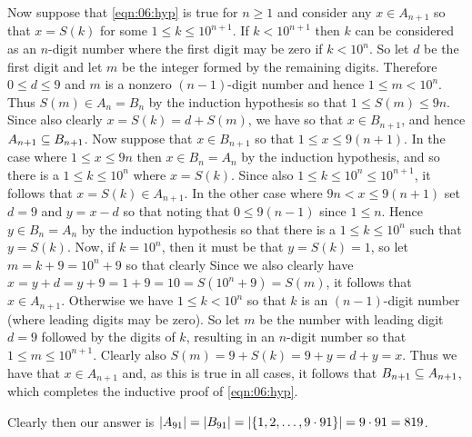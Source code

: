 \documentclass{article}
\begin{document}
{  Now suppose that \eqref{eqn:06:hyp} is true for $n \geq 1$ and consider any $x \in A_{n+1}$ so that $x = S(k)$ for some $1 \leq k \leq 10^{n+1}$.
  If $k < 10^{n+1}$ then $k$ can be considered as an $n$-digit number where the first digit may be zero if $k < 10^n$.
  So let $d$ be the first digit and let $m$ be the integer formed by the remaining digits.
  Therefore $0 \leq d \leq 9$ and $m$ is a nonzero $(n-1)$-digit number and hence $1 \leq m < 10^n$.
  Thus $S(m) \in A_n = B_n$ by the induction hypothesis so that $1 \leq S(m) \leq 9n$.
  Since also clearly $x = S(k) = d + S(m)$, we have
  so that $x \in B_{n+1}$, and hence $A_{n+1} \ss B_{n+1}$.
  Now suppose that $x \in B_{n+1}$ so that $1 \leq x \leq 9(n+1)$.
  In the case where $1 \leq x \leq 9n$ then $x \in B_n = A_n$ by the induction hypothesis, and so there is a $1 \leq k \leq 10^n$ where $x = S(k)$.
  Since also $1 \leq k \leq 10^n \leq 10^{n+1}$, it follows that $x = S(k) \in A_{n+1}$.
  In the other case where $9n < x \leq 9(n+1)$ set $d = 9$ and $y = x - d$ so that
  noting that $0 \leq 9(n-1)$ since $1 \leq n$.
  Hence $y \in B_n = A_n$ by the induction hypothesis so that there is a $1 \leq k \leq 10^n$ such that $y = S(k)$.
  Now, if $k = 10^n$, then it must be that $y = S(k) = 1$, so let $m = k + 9 = 10^n + 9$ so that clearly
  Since we also clearly have $x = y + d = y + 9 = 1 + 9 = 10 = S(10^n + 9) = S(m)$, it follows that $x \in A_{n+1}$.
  Otherwise we have $1 \leq k < 10^n$ so that $k$ is an $(n-1)$-digit number (where leading digits may be zero).
  So let $m$ be the number with leading digit $d = 9$ followed by the digits of $k$, resulting in an $n$-digit number so that $1 \leq m \leq 10^{n+1}$.
  Clearly also $S(m) = 9 + S(k) = 9 + y = d + y = x$.
  Thus we have that $x \in A_{n+1}$ and, as this is true in all cases, it follows that $B_{n+1} \ss A_{n+1}$, which completes the inductive proof of \eqref{eqn:06:hyp}.

  Clearly then our answer is $\abs{A_{91}} = \abs{B_{91}} = \abs{\braces{1, 2, \ldots, 9 \cdot 91}} = 9 \cdot 91 = 819$.
}

\end{document}
